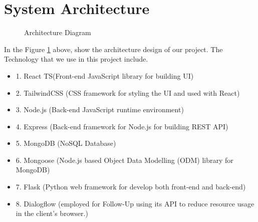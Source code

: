 \documentclass[12pt,oneside,openright,a4paper]{cpe-english-project}
\begin{document}
  \section{System Architecture}
  \begin{figure}[!h]
    \centering
    \caption{Architecture Diagram}\label{fig:System_Architecture}
  \end{figure}
  \qquad In the Figure \ref{fig:System_Architecture} above, show the architecture design of our project. The Technology that we use in this project include. \par
  \begin{itemize}
    \item[] 1. React TS(Front-end JavaScript library for building UI)
    \item[] 2. TailwindCSS (CSS framework for styling the UI and used with React)
    \item[] 3. Node.js (Back-end JavaScript runtime environment)
    \item[] 4. Express (Back-end framework for Node.js for building REST API)
    \item[] 5. MongoDB (NoSQL Database)
    \item[] 6. Mongoose (Node.js based Object Data Modelling (ODM) library for MongoDB)
    \item[] 7. Flask (Python web framework for develop both front-end and back-end)
    \item[] 8. Dialogflow (employed for Follow-Up using its API to reduce resource usage in the client’s browser.)
  \end{itemize}
\end{document}

